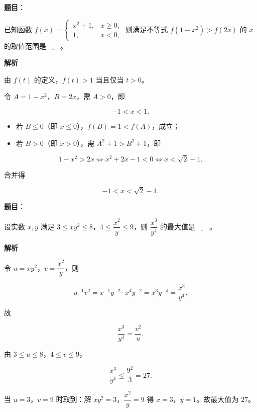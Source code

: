 \begin{answer}

\textbf{题目}：

已知函数 $f(x)=\begin{cases}x^2+1,&x\geqslant0,\\1,&x<0,\end{cases}$ 则满足不等式 $f(1-x^2)>f(2x)$ 的 $x$ 的取值范围是$\underline{\qquad}$。

\textbf{解析}

由 $f(t)$ 的定义，$f(t)>1$ 当且仅当 $t>0$。

令 $A=1-x^2$，$B=2x$，需 $A>0$，即

\nopagebreak[4]
\[-1<x<1.\]

\begin{itemize}
\item 若 $B\leqslant0$（即 $x\leqslant0$），$f(B)=1<f(A)$，成立；
\item 若 $B>0$（即 $x>0$），需 $A^2+1>B^2+1$，即
\end{itemize}

\nopagebreak[4]
\[1-x^2>2x\iff x^2+2x-1<0\iff x<\sqrt2-1.\]

合并得

\nopagebreak[4]
\[-1<x<\sqrt2-1.\]


\end{answer}
\begin{answer}

\textbf{题目}：

设实数 $x,y$ 满足 $3\leqslant xy^2\leqslant8$，$4\leqslant\dfrac{x^2}{y}\leqslant9$，则 $\dfrac{x^3}{y^4}$ 的最大值是$\underline{\qquad}$。

\textbf{解析}

令 $u=xy^2$，$v=\dfrac{x^2}{y}$，则

\nopagebreak[4]
\[u^{-1}v^2=x^{-1}y^{-2}\cdot x^4y^{-2}=x^3y^{-4}=\frac{x^3}{y^4}.\]

故

\nopagebreak[4]
\[\frac{x^3}{y^4}=\frac{v^2}{u}.\]

由 $3\leqslant u\leqslant8$，$4\leqslant v\leqslant9$，

\nopagebreak[4]
\[\frac{x^3}{y^4}\leqslant\frac{9^2}{3}=27.\]

当 $u=3$，$v=9$ 时取到：解 $xy^2=3$，$\dfrac{x^2}{y}=9$ 得 $x=3$，$y=1$。故最大值为 $27$。


\end{answer}
